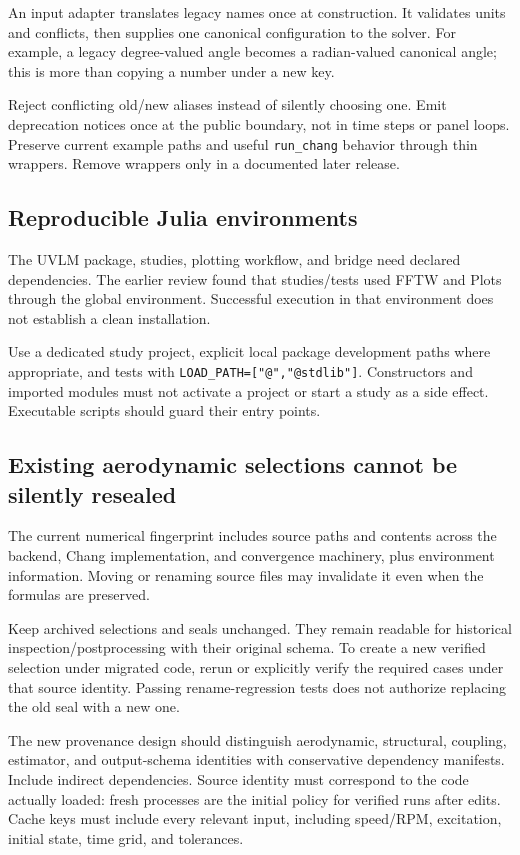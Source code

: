 \documentclass[11pt,a4paper]{article}
\newcommand{\code}{\nolinkurl}
\begin{document}
An input adapter translates legacy names once at construction. It validates
units and conflicts, then supplies one canonical configuration to the solver.
For example, a legacy degree-valued angle becomes a radian-valued canonical
angle; this is more than copying a number under a new key.

Reject conflicting old/new aliases instead of silently choosing one. Emit
deprecation notices once at the public boundary, not in time steps or panel
loops. Preserve current example paths and useful \code{run_chang} behavior
through thin wrappers. Remove wrappers only in a documented later release.

\subsection{Reproducible Julia environments}

The UVLM package, studies, plotting workflow, and bridge need declared
dependencies. The earlier review found that studies/tests used FFTW and Plots
through the global environment. Successful execution in that environment does
not establish a clean installation.

Use a dedicated study project, explicit local package development paths where
appropriate, and tests with \code{LOAD_PATH=["@","@stdlib"]}. Constructors
and imported modules must not activate a project or start a study as a side
effect. Executable scripts should guard their entry points.

\subsection{Existing aerodynamic selections cannot be silently resealed}

The current numerical fingerprint includes source paths and contents across
the backend, Chang implementation, and convergence machinery, plus environment
information. Moving or renaming source files may invalidate it even when the
formulas are preserved.

Keep archived selections and seals unchanged. They remain readable for
historical inspection/postprocessing with their original schema. To create a
new verified selection under migrated code, rerun or explicitly verify the
required cases under that source identity. Passing rename-regression tests
does not authorize replacing the old seal with a new one.

The new provenance design should distinguish aerodynamic, structural,
coupling, estimator, and output-schema identities with conservative dependency
manifests. Include indirect dependencies. Source identity must correspond to
the code actually loaded: fresh processes are the initial policy for verified
runs after edits. Cache keys must include every relevant input, including
speed/RPM, excitation, initial state, time grid, and tolerances.
\end{document}
